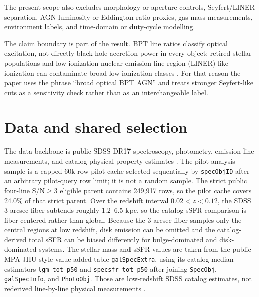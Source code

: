 \documentclass[twocolumn]{aastex631}
\begin{document}
The present scope also excludes morphology or aperture controls, Seyfert/LINER separation, AGN luminosity or Eddington-ratio proxies, gas-mass measurements, environment labels, and time-domain or duty-cycle modelling.

The claim boundary is part of the result. BPT line ratios classify optical excitation, not directly black-hole accretion power in every object; retired stellar populations and low-ionization nuclear emission-line region (LINER)-like ionization can contaminate broad low-ionization classes \citep{stasinska2008,stasinska2015}. For that reason the paper uses the phrase ``broad optical BPT AGN'' and treats stronger Seyfert-like cuts as a sensitivity check rather than as an interchangeable label.

\section{Data and shared selection}
The data backbone is public SDSS DR17 spectroscopy, photometry, emission-line measurements, and catalog physical-property estimates \citep{york2000,sdssdr17,brinchmann2004}. The pilot analysis sample is a capped 60k-row pilot cache selected sequentially by \texttt{specObjID} after an arbitrary pilot-query row limit; it is not a random sample. The strict public four-line S/N$\geq3$ eligible parent contains 249,917 rows, so the pilot cache covers 24.0\% of that strict parent.
Over the redshift interval $0.02<z<0.12$, the SDSS 3-arcsec fiber subtends roughly 1.2--6.5 kpc, so the catalog sSFR comparison is fiber-centered rather than global.
Because the 3-arcsec fiber samples only the central regions at low redshift, disk emission can be omitted and the catalog-derived total sSFR can be biased differently for bulge-dominated and disk-dominated systems.
The stellar-mass and sSFR values are taken from the public MPA-JHU-style value-added table \texttt{galSpecExtra}, using its catalog median estimators \texttt{lgm\_tot\_p50} and \texttt{specsfr\_tot\_p50} after joining \texttt{SpecObj}, \texttt{galSpecInfo}, and \texttt{PhotoObj}. Those are low-redshift SDSS catalog estimates, not rederived line-by-line physical measurements \citep{brinchmann2004,sdssdr17,york2000}.
\end{document}
